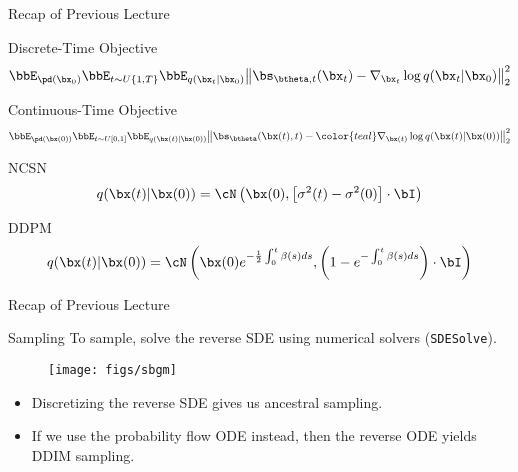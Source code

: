 \documentclass{beamer}
\begin{document}
\begin{frame}{Recap of Previous Lecture}
	\begin{block}{Discrete-Time Objective}
		\vspace{-0.3cm}
		\[
			\bbE_{\pd(\bx_0)} \bbE_{t \sim U\{1, T\}} \bbE_{q(\bx_t | \bx_0)}\bigl\| \bs_{\btheta, t}(\bx_t) - \nabla_{\bx_t} \log q(\bx_t | \bx_0) \bigr\|^2_2 
		\]
		\vspace{-0.5cm}
	\end{block}
	\begin{block}{Continuous-Time Objective}
		\vspace{-0.5cm}
		\[
			\bbE_{\pd(\bx(0))} \bbE_{t \sim U[0, 1]} \bbE_{q(\bx(t) | \bx(0))}\bigl\| \bs_{\btheta}(\bx(t), t) - {\color{teal}\nabla_{\bx(t)} \log q(\bx(t) | \bx(0))} \bigr\|^2_2 
		\]
		\vspace{-0.5cm}
	\end{block}
	\begin{block}{NCSN}
		\vspace{-0.3cm}
		\[
			q(\bx(t) | \bx(0)) = \cN\left(\bx(0), \left[\sigma^2(t) - \sigma^2(0)\right] \cdot \bI\right)
		\]
		\vspace{-0.5cm}
	\end{block}
	\begin{block}{DDPM}
		\vspace{-0.3cm}
		\[
			q(\bx(t) | \bx(0)) = \cN\left(\bx(0) e^{-\frac{1}{2} \int_0^t\beta(s)ds}, \left(1 - e^{- \int_0^t\beta(s)ds}\right) \cdot \bI\right)
		\]
		\vspace{-0.5cm}
	\end{block}
	
\end{frame}
\begin{frame}{Recap of Previous Lecture}
	\begin{block}{Sampling}
		To sample, solve the reverse SDE using numerical solvers (\texttt{SDESolve}).
		\begin{figure}
			\texttt{[image: figs/sbgm]}
		\end{figure}
		\vspace{-0.5cm}
	\end{block}
	\begin{itemize}
		\item Discretizing the reverse SDE gives us ancestral sampling.
		\item If we use the probability flow ODE instead, then the reverse ODE yields DDIM sampling.
	\end{itemize}
\end{frame}
\end{document}
